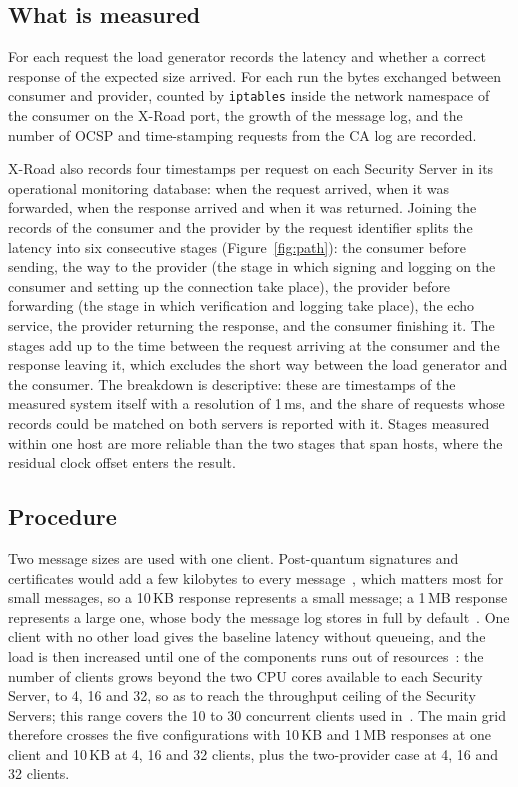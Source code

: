 \documentclass[conference,a4paper]{IEEEtran}
\newcommand{\newtext}[1]{{\color{blue}#1}}
\begin{document}
\subsection{What is measured}\label{sec:measured}

For each request the load generator records the latency and whether a correct response of the
expected size arrived. For each run the bytes exchanged between consumer and provider,
counted by \texttt{iptables} inside the network namespace of the consumer on the X-Road port, the
growth of the message log, and the number of OCSP and time-stamping requests from the CA log are
recorded.

X-Road also records four timestamps per request on each Security Server in its operational
monitoring database: when the request arrived, when it was forwarded, when the response arrived and
when it was returned. Joining the records of the consumer and the provider by the request identifier
splits the latency into six consecutive stages \newtext{(Figure~\ref{fig:path})}: the consumer before sending, the way to the provider
(the
stage in which signing and logging on the consumer and setting up the connection take place), the
provider before forwarding (the stage in which verification and
logging take place), the echo service, the provider returning the response,
and the consumer finishing it. The stages add up to the time between the request arriving at the
consumer and the response leaving it, which excludes the short way between the load generator and
the consumer. The breakdown is descriptive:
these are timestamps of the measured system itself with a resolution of 1\,ms, and the share of
requests whose records could be matched on both servers is reported with it. Stages measured within
one host are more reliable than the two stages that span hosts, where the residual clock offset enters
the result.

\subsection{Procedure}\label{sec:proc}

Two message sizes are used with one client. Post-quantum signatures and certificates would add a few
kilobytes to every message~\cite{snetkov2023}, which matters most for small messages, so a 10\,KB
response represents a small message; a 1\,MB response represents a large one, whose body the message log stores in full
by default~\cite{xroadsyspar}. One client with no other load gives the baseline latency without
queueing, and the load is then increased until one of the components runs out of
resources~\cite{taklai2020}: the number of clients grows beyond the two CPU cores available to each
Security Server, to 4, 16 and 32, so as to reach the throughput ceiling of the Security Servers; this
range covers the 10 to 30 concurrent clients used in~\cite{taklai2020}. The main grid therefore crosses the five configurations with 10\,KB and 1\,MB
responses at one client and 10\,KB at 4, 16 and 32 clients, plus the two-provider case at 4, 16 and 32 clients.
\end{document}

